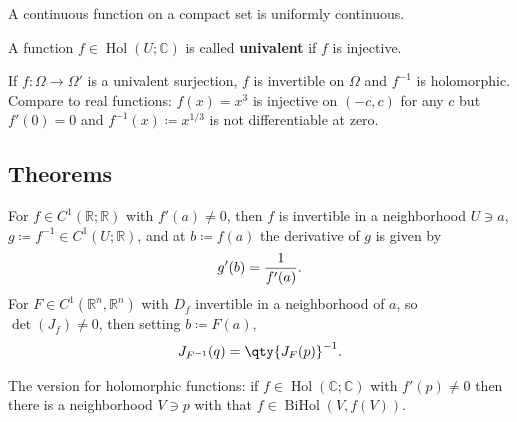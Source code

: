 \begin{remark}

A continuous function on a compact set is uniformly continuous.

\end{remark}

\begin{definition}

A function \(f\in \mathop{\mathrm{Hol}}(U; {\mathbb{C}})\) is called
\textbf{univalent} if \(f\) is injective.

\end{definition}

\begin{remark}

If \(f: \Omega \to \Omega'\) is a univalent surjection, \(f\) is
invertible on \(\Omega\) and \(f^{-1}\) is holomorphic. Compare to real
functions: \(f(x) = x^3\) is injective on \((-c, c)\) for any \(c\) but
\(f'(0) = 0\) and \(f^{-1}(x) \coloneqq x^{1/3}\) is not differentiable
at zero.

\end{remark}

\hypertarget{theorems}{%
\subsection{Theorems}\label{theorems}}

\begin{theorem}

\end{theorem}

\begin{theorem}

For \(f \in C^1({\mathbb{R}}; {\mathbb{R}})\) with \(f'(a) \neq 0\),
then \(f\) is invertible in a neighborhood \(U \ni a\),
\(g\coloneqq f^{-1}\in C^1(U; {\mathbb{R}})\), and at
\(b\coloneqq f(a)\) the derivative of \(g\) is given by
\begin{align*}
g'(b) = {1 \over f'(a)}
.\end{align*}
For \(F \in C^1({\mathbb{R}}^n, {\mathbb{R}}^n)\) with \(D_f\)
invertible in a neighborhood of \(a\), so
\(\operatorname{det}(J_f)\neq 0\), then setting \(b\coloneqq F(a)\),
\begin{align*}
J_{F^{-1}}(q) = \qty{J_F(p)}^{-1}
.\end{align*}

The version for holomorphic functions: if
\(f\in \mathop{\mathrm{Hol}}({\mathbb{C}}; {\mathbb{C}})\) with
\(f'(p)\neq 0\) then there is a neighborhood \(V\ni p\) with that
\(f\in \mathop{\mathrm{BiHol}}(V, f(V))\).

\end{theorem}

